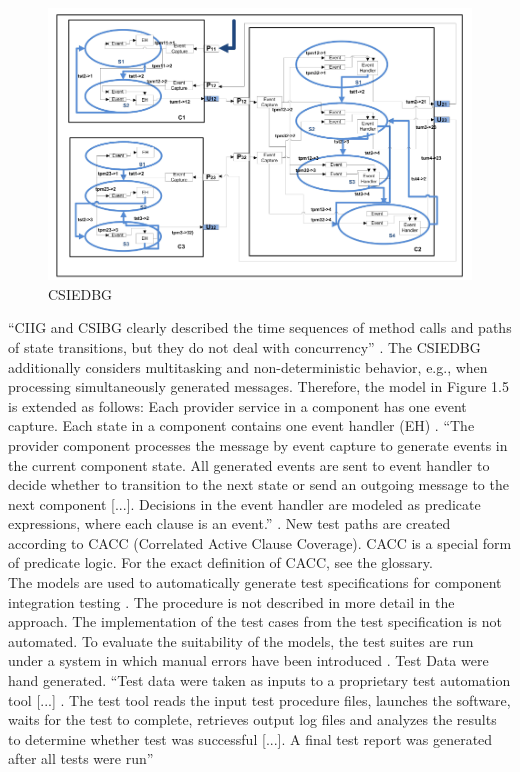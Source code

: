 \begin{figure}[H]
	\centering
	\includegraphics[scale=0.9]{../images/CSIEDBG} 
	\caption{CSIEDBG \cite{Guan2015} }
\end{figure}
\enquote{CIIG and CSIBG clearly described the time sequences
of method calls and paths of state transitions, but they do not deal
with concurrency} \cite{Guan2015}. The CSIEDBG additionally
considers multitasking and non-deterministic behavior, e.g., when
processing simultaneously generated messages. Therefore, the model
in Figure 1.5 is extended as follows: Each provider service in a component
has one event capture. Each state in a component contains one event
handler (EH) \cite{Guan2015}. \enquote{The provider component
processes the message by event capture to generate events in the current
component state. All generated events are sent to event handler to
decide whether to transition to the next state or send an outgoing
message to the next component {[}...{]}. Decisions in the event handler
are modeled as predicate expressions, where each clause is an event.}
\cite{Guan2015}. New test paths are created according to CACC (Correlated
Active Clause Coverage). CACC is a special form of predicate logic.
For the exact definition of CACC, see the glossary.\\
The models are used to automatically generate test specifications
for component integration testing \cite{Guan2015}. The procedure
is not described in more detail in the approach. The implementation
of the test cases from the test specification is not automated. To
evaluate the suitability of the models, the test suites are run under
a system in which manual errors have been introduced \cite{Guan2015}.
Test Data were hand generated. \enquote{Test data were taken
as inputs to a proprietary test automation tool {[}...{]} . The test
tool reads the input test procedure files, launches the software,
waits for the test to complete, retrieves output log files and analyzes
the results to determine whether test was successful {[}...{]}. A
final test report was generated after all tests were run}
